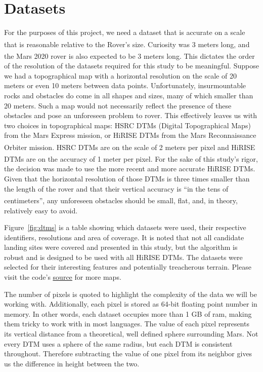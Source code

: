 \documentclass[12pt]{article}
\newcommand{\supcite}[1]{\textsuperscript{\cite{#1}}}
\begin{document}
\section{Datasets}
\label{sec:datasets}
\par For the purposes of this project, we need a dataset that is accurate on a scale that is reasonable relative to the Rover's size. Curiosity was 3 meters long\supcite{bib:curiosity}, and the Mars 2020 rover is also expected to be 3 meters long\supcite{bib:rover2020}. This dictates the order of the resolution of the datasets required for this study to be meaningful. Suppose we had a topographical map with a horizontal resolution on the scale of 20 meters or even 10 meters between data points. Unfortunately, insurmountable rocks and obstacles do come in all shapes and sizes, many of which smaller than 20 meters. Such a map would not necessarily reflect the presence of these obstacles and pose an unforeseen problem to rover. This effectively leaves us with two choices in topographical maps: HSRC DTMs (Digital Topographical Maps) from the Mars Express mission, or HiRISE DTMs from the Mars Reconnaissance Orbiter mission. HSRC DTMs are on the scale of 2 meters per pixel\supcite{bib:hsrc} and HiRISE DTMs are on the accuracy of 1 meter per pixel\supcite{bib:abouthirise}. For the sake of this study's rigor, the decision was made to use the more recent and more accurate HiRISE DTMs. Given that the horizontal resolution of those DTMs is three times smaller than the length of the rover and that their vertical accuracy is ``in the tens of centimeters''\supcite{bib:abouthirise}, any unforeseen obstacles should be small, flat, and, in theory, relatively easy to avoid.
\par Figure~\ref{fig:dtms} is a table showing which datasets were used, their respective identifiers, resolutions and area of coverage. It is noted that not all candidate landing sites were covered and presented in this study, but the algorithm is robust and is designed to be used with all HiRISE DTMs. The datasets were selected for their interesting features and potentially treacherous terrain. Please visit the code's \href{https://github.com/PapaCharlie/Rover-Climb-Angles/tree/master/figures/maps/}{\ttfamily\color{blue} \underline{source}} for more maps.
\par The number of pixels is quoted to highlight the complexity of the data we will be working with. Additionally, each pixel is stored as 64-bit floating point number in memory. In other words, each dataset occupies more than 1 GB of ram, making them tricky to work with in most languages. The value of each pixel represents its vertical distance from a theoretical, well defined sphere surrounding Mars. Not every DTM uses a sphere of the same radius, but each DTM is consistent throughout. Therefore subtracting the value of one pixel from its neighbor gives us the difference in height between the two.
\end{document}
